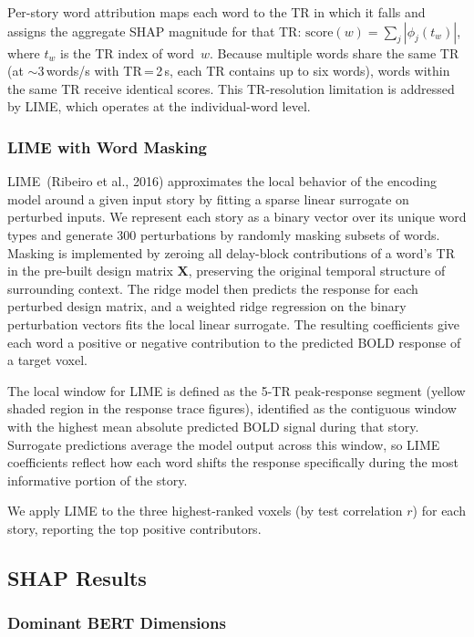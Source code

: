 \documentclass[letterpaper,11pt]{article}
\begin{document}
Per-story word attribution maps each word to the TR in which it falls and
assigns the aggregate SHAP magnitude for that TR:
$\text{score}(w) = \sum_j |\phi_j(t_w)|$,
where $t_w$ is the TR index of word~$w$.  Because multiple words share the same
TR (at $\sim$3\,words/s with TR\,=\,2\,s, each TR contains up to six words),
words within the same TR receive identical scores.  This TR-resolution limitation
is addressed by LIME, which operates at the individual-word level.

\subsubsection{LIME with Word Masking}

LIME~(Ribeiro et al., 2016) approximates the local behavior of the encoding
model around a given input story by fitting a sparse linear surrogate on
perturbed inputs.  We represent each story as a binary vector over its unique
word types and generate 300 perturbations by randomly masking subsets of words.
Masking is implemented by zeroing all delay-block contributions of a word's
TR in the pre-built design matrix $\bm{X}$, preserving the original temporal
structure of surrounding context.  The ridge model then predicts the response
for each perturbed design matrix, and a weighted ridge regression on the binary
perturbation vectors fits the local linear surrogate.  The resulting
coefficients give each word a positive or negative contribution to the predicted
BOLD response of a target voxel.

The local window for LIME is defined as the 5-TR peak-response segment
(yellow shaded region in the response trace figures), identified as the
contiguous window with the highest mean absolute predicted BOLD signal during
that story.  Surrogate predictions average the model output across this
window, so LIME coefficients reflect how each word shifts the response
specifically during the most informative portion of the story.

We apply LIME to the three highest-ranked voxels (by test correlation $r$) for
each story, reporting the top positive contributors.


\subsection{SHAP Results}


\subsubsection{Dominant BERT Dimensions}
\end{document}

